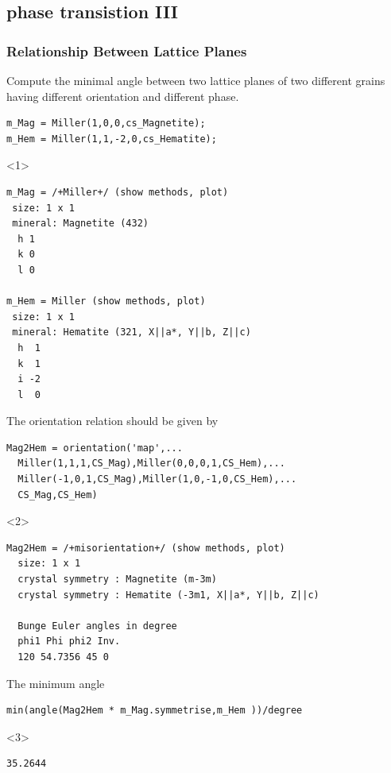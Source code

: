 \documentclass[compress]{beamer}
\begin{document}
\subsection*{phase transistion III}

\begin{frame}[fragile]
  \frametitle{Relationship Between Lattice Planes}

  \begin{overlayarea}{\textwidth}{8cm}

  Compute the minimal angle between two lattice planes of two
  different grains having different orientation and different phase.
 \begin{lstlisting}[style=input]
m_Mag = Miller(1,0,0,cs_Magnetite);
m_Hem = Miller(1,1,-2,0,cs_Hematite);
 \end{lstlisting}
  \begin{onlyenv}<1>
    \vspace{-.3cm}
    \begin{lstlisting}[style=output]
m_Mag = /+Miller+/ (show methods, plot)
 size: 1 x 1
 mineral: Magnetite (432)
  h 1
  k 0
  l 0

m_Hem = Miller (show methods, plot)
 size: 1 x 1
 mineral: Hematite (321, X||a*, Y||b, Z||c)
  h  1
  k  1
  i -2
  l  0
\end{lstlisting}
  \end{onlyenv}

  \pause
  \medskip

  The orientation relation should be given by
  \begin{lstlisting}[style=input]
Mag2Hem = orientation('map',...
  Miller(1,1,1,CS_Mag),Miller(0,0,0,1,CS_Hem),...
  Miller(-1,0,1,CS_Mag),Miller(1,0,-1,0,CS_Hem),...
  CS_Mag,CS_Hem)
  \end{lstlisting}
  \begin{onlyenv}<2>
    \vspace{-0.3cm}
    \begin{lstlisting}[style=output]
Mag2Hem = /+misorientation+/ (show methods, plot)
  size: 1 x 1
  crystal symmetry : Magnetite (m-3m)
  crystal symmetry : Hematite (-3m1, X||a*, Y||b, Z||c)

  Bunge Euler angles in degree
  phi1 Phi phi2 Inv.
  120 54.7356 45 0
    \end{lstlisting}
  \end{onlyenv}

  \pause
  \medskip

  The minimum angle
  \begin{lstlisting}[style=input]
min(angle(Mag2Hem * m_Mag.symmetrise,m_Hem ))/degree
 \end{lstlisting}
  \begin{onlyenv}<3>
    \vspace{-.3cm}
    \begin{lstlisting}[style=output]
  35.2644
    \end{lstlisting}
  \end{onlyenv}

\end{overlayarea}

\end{frame}
\end{document}

